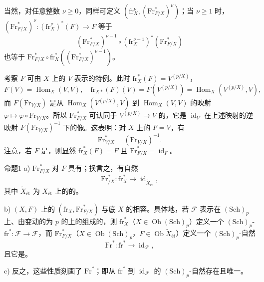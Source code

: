 当然，对任意整数 $\nu\geq0$，同样可定义 $(\mathrm{fr}_X^\nu,(\mathrm{Fr}_{F/X}^{*})^\nu)$；当 $\nu\geq1$ 时， $(\mathrm{Fr}_{F/X}^{*})^\nu:(\mathrm{fr}_X^\nu)^*(F)\to F$ 等于
\[
(\mathrm{Fr}_{F/X}^{*})^{\nu-1}\circ(\mathrm{fr}_X^{\nu-1})^*(\mathrm{Fr}_{F/X}^{*})
\]
也等于 $\mathrm{Fr}_{F/X}^{*}\circ\mathrm{fr}_X^*((\mathrm{Fr}_{F/X}^{*})^{\nu-1})$。

考察 $F$ 可由 $X$ 上的 $V$ 表示的特例。此时 $\mathrm{fr}_X^*(F)=V^{(p/X)}$，
\[
F(V)=\operatorname{Hom}_X(V,V),\quad
\mathrm{fr}_{X*}(F)(V)=F(V^{(p/X)})=\operatorname{Hom}_X(V^{(p/X)},V),
\]
而 $F(\mathrm{Fr}_{V/X})$ 是从 $\operatorname{Hom}_X(V^{(p/X)},V)$ 到 $\operatorname{Hom}_X(V,V)$ 的映射 $\varphi\mapsto\varphi\circ\mathrm{Fr}_{V/X}$。所以 $\mathrm{Fr}_{F/X}^{*}$ 可认同于 $V^{(p/X)}\to V$ 的，它是 $\operatorname{id}_V$ 在上述映射的逆映射 $F(\mathrm{Fr}_{V/X})^{-1}$ 下的像。这表明：对 $X$ 上的 $F=V$，有
\[
\mathrm{Fr}_{V/X}^{*}=(\mathrm{Fr}_{V/X})^{-1}.
\]
注意，若 $F$ 是，则显然 $\mathrm{fr}_X^*(F)=F$ 且 $\mathrm{Fr}_{F/X}^{*}=\operatorname{id}_F$。
\begin{SGAresult}{命题}{1}
a)  $\mathrm{Fr}_{F/X}^{*}$ 对 $F$ 具有；换言之，有自然
\[
\mathrm{Fr}_{/X}^{*}:\mathrm{fr}_X^*\longrightarrow\operatorname{id}_{\widetilde X_{\text{ét}}},
\]
其中 $\widetilde X_{\text{ét}}$ 为 $X_{\text{ét}}$ 上的的。

b) $(X,F)$ 上的 $(\mathrm{fr}_X,\mathrm{Fr}_{F/X}^{*})$ 与底 $X$ 的相容。具体地，若 $\mathscr F$ 表示在 $(\mathrm{Sch})_p$ 上、由变动的为 $p$ 的上的组成的，则 $\mathrm{fr}_X^*$（$X\in\operatorname{Ob}(\mathrm{Sch})_p$）定义一个 $(\mathrm{Sch})_p$- $\mathrm{fr}^*:\mathscr F\to\mathscr F$，而 $\mathrm{Fr}_{F/X}^{*}$（$X\in\operatorname{Ob}(\mathrm{Sch})_p$，$F\in\operatorname{Ob}\widetilde X_{\text{ét}}$）定义一个 $(\mathrm{Sch})_p$-自然
\[
\mathrm{Fr}^{*}:\mathrm{fr}^{*}\longrightarrow\operatorname{id}_{\mathscr F},
\]
且它是。

c) 反之，这些性质刻画了 $\mathrm{Fr}^{*}$；即从 $\mathrm{fr}^{*}$ 到 $\operatorname{id}_{\mathscr F}$ 的 $(\mathrm{Sch})_p$-自然存在且唯一。
\end{SGAresult}
